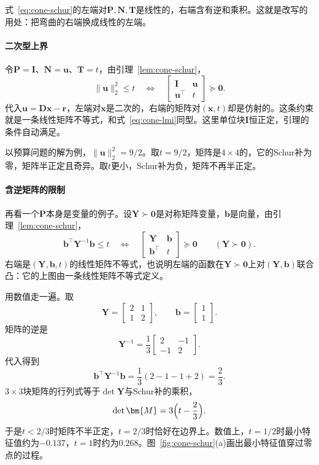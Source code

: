 式~\eqref{eq:cone-schur}的左端对$\bm{P},\bm{N},\bm{T}$是线性的，右端含有逆和乘积。这就是改写的用处：把弯曲的右端换成线性的左端。

\paragraph{二次型上界}
令$\bm{P}=\bm{I}$、$\bm{N}=\bm{u}$、$\bm{T}=t$，由引理~\ref{lem:cone-schur}，
\begin{equation}
 \lVert\bm{u}\rVert_2^2\leq t\quad\Longleftrightarrow\quad\begin{bmatrix}\bm{I}&\bm{u}\\\bm{u}^\top&t\end{bmatrix}\succeq\bm{0}.
 \label{eq:cone-schur-quadratic}
\end{equation}
代入$\bm{u}=\bm{D}\bm{x}-\bm{r}$，左端对$\bm{x}$是二次的，右端的矩阵对$(\bm{x},t)$却是仿射的。这条约束就是一条线性矩阵不等式，和式~\eqref{eq:cone-lmi}同型。这里单位块$\bm{I}$恒正定，引理的条件自动满足。

以预算问题的解为例，$\lVert\bm{u}\rVert_2^2=9/2$。取$t=9/2$，矩阵是$4\times4$的，它的Schur补为零，矩阵半正定且奇异。取$t$更小，Schur补为负，矩阵不再半正定。

\paragraph{含逆矩阵的限制}
再看一个$\bm{P}$本身是变量的例子。设$\bm{Y}\succ\bm{0}$是对称矩阵变量，$\bm{b}$是向量，由引理~\ref{lem:cone-schur}，
\begin{equation}
 \bm{b}^\top\bm{Y}^{-1}\bm{b}\leq t\quad\Longleftrightarrow\quad\begin{bmatrix}\bm{Y}&\bm{b}\\\bm{b}^\top&t\end{bmatrix}\succeq\bm{0}\qquad(\bm{Y}\succ\bm{0}).
 \label{eq:cone-schur-inverse}
\end{equation}
右端是$(\bm{Y},\bm{b},t)$的线性矩阵不等式，也说明左端的函数在$\bm{Y}\succ\bm{0}$上对$(\bm{Y},\bm{b})$联合凸：它的上图由一条线性矩阵不等式定义。

用数值走一遍。取
\[
 \bm{Y}=\begin{bmatrix}2&1\\1&2\end{bmatrix},\qquad\bm{b}=\begin{bmatrix}1\\1\end{bmatrix}.
\]
矩阵的逆是
\[
 \bm{Y}^{-1}=\frac13\begin{bmatrix}2&-1\\-1&2\end{bmatrix}.
\]
代入得到
\[
 \bm{b}^\top\bm{Y}^{-1}\bm{b}=\frac13(2-1-1+2)=\frac23.
\]
$3\times3$块矩阵的行列式等于$\det\bm{Y}$与Schur补的乘积，
\[
 \det\bm{M}=3\Bigl(t-\frac23\Bigr).
\]
于是$t<2/3$时矩阵不半正定，$t=2/3$时恰好在边界上。数值上，$t=1/2$时最小特征值约为$-0.137$，$t=1$时约为$0.268$。图~\ref{fig:cone-schur}(a)画出最小特征值穿过零点的过程。

